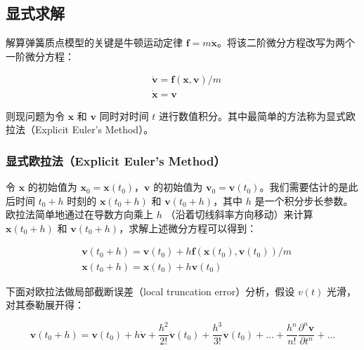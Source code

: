 \documentclass[UTF8]{ctexart}
\begin{document}
\subsection{显式求解}

解算弹簧质点模型的关键是牛顿运动定律 $\mathbf{f} = m \ddot{\mathbf{x}}$。将该二阶微分方程改写为两个一阶微分方程：

\begin{large}
\begin{equation}
\begin{split}
&\dot{\mathbf{v}} = \mathbf{f}(\mathbf{x}, \mathbf{v}) / m \\
&\dot{\mathbf{x}} = \mathbf{v}
\end{split}
\end{equation}
\end{large}

则现问题为令 $\mathbf{x}$ 和 $\mathbf{v}$ 同时对时间 $t$ 进行数值积分。其中最简单的方法称为显式欧拉法（Explicit Euler's Method）。

\subsubsection{显式欧拉法（Explicit Euler's Method）}

令 $\mathbf{x}$ 的初始值为 $\mathbf{x}_0 = \mathbf{x}(t_0)$，$\mathbf{v}$ 的初始值为 $\mathbf{v}_0 = \mathbf{v}(t_0)$。我们需要估计的是此后时间 $t_0 + h$ 时刻的 $\mathbf{x}(t_0+h)$ 和 $\mathbf{v}(t_0 + h)$，其中 $h$ 是一个积分步长参数。欧拉法简单地通过在导数方向乘上 $h$ （沿着切线斜率方向移动）来计算 $\mathbf{x}(t_0+h)$ 和 $\mathbf{v}(t_0 + h)$，求解上述微分方程可以得到：

\begin{large}
\begin{equation}
\begin{split}
& \mathbf{v}(t_0 + h) = \mathbf{v}(t_0) + h \mathbf{f}(\mathbf{x}(t_0), \mathbf{v}(t_0)) / m \\
& \mathbf{x}(t_0 + h) = \mathbf{x}(t_0) + h \mathbf{v} (t_0)
\end{split}
\end{equation}
\end{large}

下面对欧拉法做局部截断误差（local truncation error）分析，假设 $v(t)$ 光滑，对其泰勒展开得： \par

\begin{large}
\begin{equation}
\mathbf{v}(t_0+h) = \mathbf{v}(t_0) + h \dot{\mathbf{v}} + \frac{h^2}{2!} \ddot{\mathbf{v}}(t_0) + 
\frac{h^3}{3!} \dddot{\mathbf{v}}(t_0)+...+ \frac{h^n}{n!} \frac{\partial^n \mathbf{v}}{\partial t^n} + ...
\end{equation}
\end{large}
\end{document}

